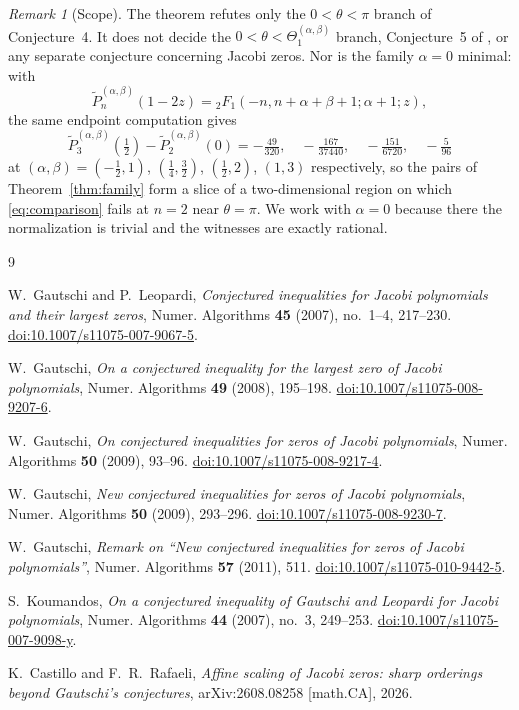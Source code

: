 \documentclass[11pt]{amsart}
\theoremstyle{remark}
\newtheorem{remark}[theorem]{Remark}
\begin{document}
\begin{remark}[Scope]
The theorem refutes only the $0<\theta<\pi$ branch of
Conjecture~4. It does not decide the
$0<\theta<\Theta_1^{(\alpha,\beta)}$ branch, Conjecture~5 of
\cite{GautschiLeopardi}, or any separate conjecture concerning Jacobi
zeros. Nor is the family $\alpha=0$ minimal: with
\[
\widetilde P_n^{(\alpha,\beta)}(1-2z)
={}_2F_1(-n,n+\alpha+\beta+1;\alpha+1;z),
\]
the same endpoint computation gives
\[
\widetilde P_3^{(\alpha,\beta)}\!\left(\tfrac12\right)
-\widetilde P_2^{(\alpha,\beta)}(0)
=-\tfrac{49}{320},\quad
-\tfrac{167}{37440},\quad
-\tfrac{151}{6720},\quad
-\tfrac{5}{96}
\]
at $(\alpha,\beta)=(-\tfrac12,1)$, $(\tfrac14,\tfrac32)$,
$(\tfrac12,2)$, $(1,3)$ respectively, so the pairs of
Theorem~\ref{thm:family} form a slice of a
two-dimensional region on which \eqref{eq:comparison} fails at $n=2$
near $\theta=\pi$. We work with $\alpha=0$ because there the
normalization is trivial and the witnesses are exactly rational.
\end{remark}

\begin{thebibliography}{9}

W.~Gautschi and P.~Leopardi,
\emph{Conjectured inequalities for Jacobi polynomials and their
largest zeros},
Numer. Algorithms \textbf{45} (2007), no.~1--4, 217--230.
\href{https://doi.org/10.1007/s11075-007-9067-5}
{doi:10.1007/s11075-007-9067-5}.

W.~Gautschi,
\emph{On a conjectured inequality for the largest zero of Jacobi
polynomials},
Numer. Algorithms \textbf{49} (2008), 195--198.
\href{https://doi.org/10.1007/s11075-008-9207-6}
{doi:10.1007/s11075-008-9207-6}.

W.~Gautschi,
\emph{On conjectured inequalities for zeros of Jacobi polynomials},
Numer. Algorithms \textbf{50} (2009), 93--96.
\href{https://doi.org/10.1007/s11075-008-9217-4}
{doi:10.1007/s11075-008-9217-4}.

W.~Gautschi,
\emph{New conjectured inequalities for zeros of Jacobi polynomials},
Numer. Algorithms \textbf{50} (2009), 293--296.
\href{https://doi.org/10.1007/s11075-008-9230-7}
{doi:10.1007/s11075-008-9230-7}.

W.~Gautschi,
\emph{Remark on ``New conjectured inequalities for zeros of Jacobi
polynomials''},
Numer. Algorithms \textbf{57} (2011), 511.
\href{https://doi.org/10.1007/s11075-010-9442-5}
{doi:10.1007/s11075-010-9442-5}.

S.~Koumandos,
\emph{On a conjectured inequality of Gautschi and Leopardi for Jacobi
polynomials},
Numer. Algorithms \textbf{44} (2007), no.~3, 249--253.
\href{https://doi.org/10.1007/s11075-007-9098-y}
{doi:10.1007/s11075-007-9098-y}.

K.~Castillo and F.~R.~Rafaeli,
\emph{Affine scaling of Jacobi zeros: sharp orderings beyond
Gautschi's conjectures},
arXiv:2608.08258 [math.CA], 2026.

\end{thebibliography}
\end{document}
